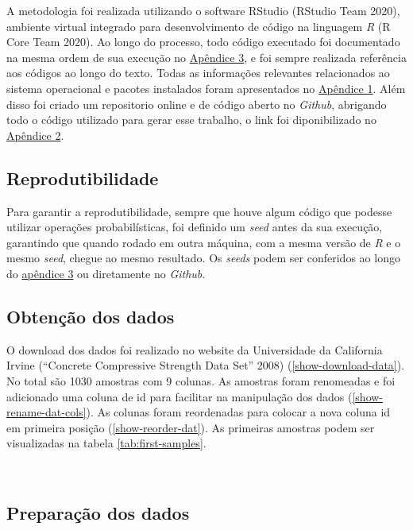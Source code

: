 \documentclass[]{article}
\begin{document}
A metodologia foi realizada utilizando o software RStudio (RStudio Team
2020), ambiente virtual integrado para desenvolvimento de código na
linguagem \emph{R} (R Core Team 2020). Ao longo do processo, todo código
executado foi documentado na mesma ordem de sua execução no
\protect\hyperlink{appendix3}{Apêndice 3}, e foi sempre realizada
referência aos códigos ao longo do texto. Todas as informações
relevantes relacionados ao sistema operacional e pacotes instalados
foram apresentados no \protect\hyperlink{appendix1}{Apêndice 1}. Além
disso foi criado um repositorio online e de código aberto no
\emph{Github}, abrigando todo o código utilizado para gerar esse
trabalho, o link foi diponibilizado no
\protect\hyperlink{appendix2}{Apêndice 2}.

\hypertarget{reprodutibilidade}{%
\subsection{Reprodutibilidade}\label{reprodutibilidade}}

Para garantir a reprodutibilidade, sempre que houve algum código que
podesse utilizar operações probabilísticas, foi definido um \emph{seed}
antes da sua execução, garantindo que quando rodado em outra máquina,
com a mesma versão de \emph{R} e o mesmo \emph{seed}, chegue ao mesmo
resultado. Os \emph{seeds} podem ser conferidos ao longo do
\protect\hyperlink{appendix}{apêndice 3} ou diretamente no
\emph{Github}.

\hypertarget{obtenuxe7uxe3o-dos-dados}{%
\subsection{Obtenção dos dados}\label{obtenuxe7uxe3o-dos-dados}}

O download dos dados foi realizado no website da Universidade da
California Irvine (``Concrete Compressive Strength Data Set'' 2008)
(\ref{show-download-data}). No total são 1030 amostras com 9 colunas. As
amostras foram renomeadas e foi adicionado uma coluna de id para
facilitar na manipulação dos dados (\ref{show-rename-dat-cols}). As
colunas foram reordenadas para colocar a nova coluna id em primeira
posição (\ref{show-reorder-dat}). As primeiras amostras podem ser
visualizadas na tabela \ref{tab:first-samples}.

~

\hypertarget{preparauxe7uxe3o-dos-dados}{%
\subsection{Preparação dos dados}\label{preparauxe7uxe3o-dos-dados}}
\end{document}
